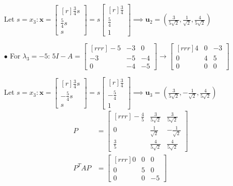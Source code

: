 \documentclass{article}
\newcommand\ddfrac[2]{\frac{\displaystyle #1}{\displaystyle #2}}
\begin{document}
\begin{minipage}{0.54\linewidth}
        Let $s = x_3 : \textbf{x} = \begin{bmatrix}[r]
            \frac{3}{4}s \\
            \frac{5}{4}s \\
            s
        \end{bmatrix} =s \begin{bmatrix}[r]
            \frac{3}{4} \\
            \frac{5}{4} \\
            1 
        \end{bmatrix} \implies \textbf{u}_2 = \left( \ddfrac{3}{5\sqrt{2}} , \ddfrac{1}{\sqrt{2}} , \ddfrac{4}{5\sqrt{2}}  \right) $ 

        $\bullet$ For $ \lambda _3 = -5$: $5I - A = \begin{bmatrix}[rrr]
            -5 & -3 & 0 \\
            -3 & -5 & -4 \\
            0 & -4 & -5 
        \end{bmatrix} \to \begin{bmatrix}[rrr]
            4 & 0 & -3 \\
            0 & 4 & 5 \\
            0 & 0 & 0 
        \end{bmatrix} $

        Let $s = x_3 : \textbf{x} = \begin{bmatrix}[r]
            \frac{3}{4}s \\
            - \frac{5}{4}s \\
            s 
        \end{bmatrix} = s \begin{bmatrix}[r]
            \frac{3}{4} \\
            - \frac{5}{4}\\
            1
        \end{bmatrix} \implies \textbf{u}_3 = \left( \ddfrac{3}{5\sqrt{2}} , -\ddfrac{1}{\sqrt{2}} , \ddfrac{4}{5\sqrt{2}}  \right)$
        \begin{equation*}
            \begin{split}
                P &= \begin{bmatrix}[rrr]
            -\ddfrac{4}{5} & \ddfrac{3}{5\sqrt{2}} & \ddfrac{3}{5\sqrt{2}} \\
            0 & \ddfrac{1}{\sqrt{2}} & - \ddfrac{1}{\sqrt{2}} \\
            \ddfrac{3}{5} &  \ddfrac{4}{5\sqrt{2}} & \ddfrac{4}{5\sqrt{2}} 
        \end{bmatrix} \\
                    P^TAP &= \begin{bmatrix}[rrr]
                        0 & 0 & 0 \\
                        0 & 5 & 0 \\
                        0 & 0 & -5 
                    \end{bmatrix} 
            \end{split}
        \end{equation*}
    \end{minipage} %
\end{document}
